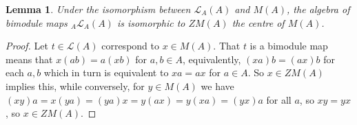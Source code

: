 \documentclass[a4paper,11pt]{article}
\theoremstyle{plain}
\newtheorem{lemma}[proposition]{Lemma}
\theoremstyle{remark}
\newcommand{\mc}[1]{\mathcal{#1}}
\begin{document}
\begin{lemma}\label{lem:bimod_is_centre}
Under the isomorphism between $\mc L_A(A)$ and $M(A)$, the algebra of bimodule maps ${}_A\mc L_A(A)$ is isomorphic to $ZM(A)$ the centre of $M(A)$.
\end{lemma}
\begin{proof}
Let $t\in\mc L(A)$ correspond to $x\in M(A)$.  That $t$ is a bimodule map means that $x(ab) = a(xb)$ for $a,b\in A$, equivalently, $(xa)b = (ax)b$ for each $a,b$ which in turn is equivalent to $xa=ax$ for $a\in A$.  So $x\in ZM(A)$ implies this, while conversely, for $y\in M(A)$ we have $(xy)a = x(ya) = (ya)x = y(ax) = y(xa) = (yx)a$ for all $a$, so $xy=yx$, so $x\in ZM(A)$.
\end{proof}



\end{document}
